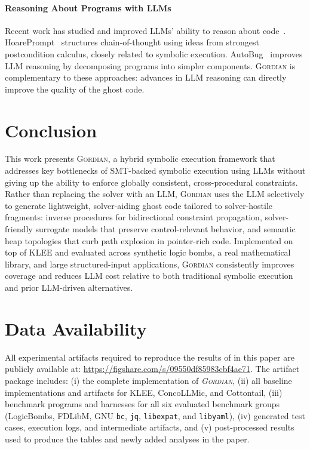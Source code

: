 \documentclass[acmsmall,screen,nonacm]{acmart}
\newcommand{\projName}{\textsc{Gordian}\xspace}
\theoremstyle{definition}
\begin{document}
\paragraph*{Reasoning About Programs with LLMs} Recent work has studied and improved LLMs' ability to reason about code~\cite{chen2024reasoning,liu2025evaluating}. HoarePrompt~\cite{bouras2025hoareprompt} structures chain-of-thought using ideas from strongest postcondition calculus, closely related to symbolic execution. AutoBug~\cite{autobug} improves LLM reasoning by decomposing programs into simpler components. \projName is complementary to these approaches: advances in LLM reasoning can directly improve the quality of the ghost code.


\section{Conclusion}

This work presents \projName, a hybrid symbolic execution framework that addresses key bottlenecks of SMT-backed symbolic execution using LLMs without giving up the ability to enforce globally consistent, cross-procedural constraints. Rather than replacing the solver with an LLM, \projName uses the LLM selectively to generate lightweight, solver-aiding ghost code tailored to solver-hostile fragments: inverse procedures for bidirectional constraint propagation, solver-friendly surrogate models that preserve control-relevant behavior, and semantic heap topologies that curb path explosion in pointer-rich code. Implemented on top of KLEE and evaluated across synthetic logic bombs, a real mathematical library, and large structured-input applications, \projName consistently improves coverage and reduces LLM cost relative to both traditional symbolic execution and prior LLM-driven alternatives.

\section*{Data Availability}

All experimental artifacts required to reproduce the results of in this paper are publicly available at:
\url{https://figshare.com/s/09550df85983cbf4ae71}. 
The artifact package includes: (i) the complete implementation of \emph{\projName{}}, (ii) all baseline implementations and
  artifacts for KLEE, ConcoLLMic, and Cottontail, (iii) benchmark programs and harnesses for all six evaluated benchmark
  groups (LogicBombs, FDLibM, GNU \texttt{bc}, \texttt{jq}, \texttt{libexpat}, and \texttt{libyaml}), (iv) generated test
  cases, execution logs, and intermediate artifacts, and (v) post-processed results used to produce the tables and newly added
  analyses in the paper.
\end{document}
